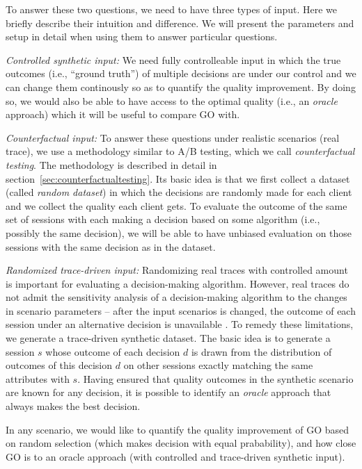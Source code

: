 To answer these two questions, we need to have three types of input. Here we briefly describe their intuition and difference. We will present the parameters and setup in detail when using them to answer particular questions.
\begin{packeditemize}
	\item {\it Controlled synthetic input:} We need fully controlleable input in which the true outcomes (i.e., ``ground truth'') of multiple decisions are under our control and we can change them continously so as to quantify the quality improvement. By doing so, we would also be able to have access to the optimal quality (i.e., an {\it oracle} approach) which it will be useful to compare GO with.
	\item {\it Counterfactual input:} To answer these questions under realistic scenarios (real trace), we use a methodology similar to A/B testing, which we call {\it counterfactual testing}. The methodology is described in detail in section~\ref{sec:counterfactualtesting}. Its basic idea is that we first collect a dataset (called {\it random dataset}) in which the decisions are randomly made for each client and we collect the quality each client gets. To evaluate the outcome of the same set of sessions with each making a decision based on some algorithm (i.e., possibly the same decision), we will be able to have unbiased evaluation on those sessions with the same decision as in the dataset.
	\item {\it Randomized trace-driven input:} Randomizing real traces with controlled amount is important for evaluating a decision-making algorithm. However, real traces do not admit the sensitivity analysis of a decision-making algorithm to the changes in scenario parameters -- after the input scenarios is changed, the outcome of each session under an alternative decision is unavailable .  To remedy these limitations, we generate a trace-driven synthetic dataset. The basic idea is to generate a session $s$ whose outcome of each decision $d$ is drawn from the distribution of outcomes of this decision $d$ on other sessions exactly matching the same attributes with $s$. Having ensured that quality outcomes in the synthetic scenario are known for any decision, it is possible to identify an {\it oracle} approach that always makes the best decision.
\end{packeditemize}
In any scenario, we would like to quantify the quality improvement of GO based on random selection (which makes decision with equal prabability), and how close GO is to an oracle approach (with controlled and trace-driven synthetic input).

